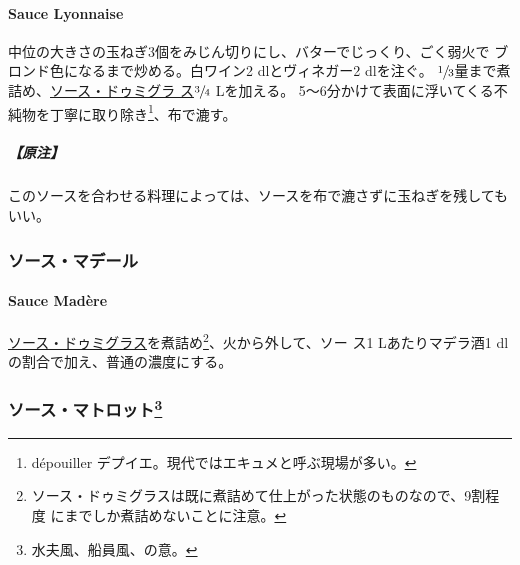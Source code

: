 \hypertarget{sauce-lyonnaise}{%
\paragraph{Sauce Lyonnaise}\label{sauce-lyonnaise}}


中位の大きさの玉ねぎ3個をみじん切りにし、バターでじっくり、ごく弱火で
ブロンド色になるまで炒める。白ワイン2 dlとヴィネガー2 dlを注ぐ。
\(\sfrac{1}{3}\)量まで煮詰め、\protect\hyperlink{sauce-demi-glace}{ソース・ドゥミグラ
ス}\(\sfrac{3}{4}\) Lを加える。
5〜6分かけて表面に浮いてくる不純物を丁寧に取り除き\footnote{dépouiller
  デプイエ。現代ではエキュメと呼ぶ現場が多い。}、布で漉す。

\hypertarget{ux539fux6ce8-5}{%
\subparagraph{【原注】}\label{ux539fux6ce8-5}}

このソースを合わせる料理によっては、ソースを布で漉さずに玉ねぎを残してもいい。

\maeaki

\hypertarget{ux30bdux30fcux30b9ux30deux30c7ux30fcux30eb}{%
\subsubsection{ソース・マデール}\label{ux30bdux30fcux30b9ux30deux30c7ux30fcux30eb}}

\hypertarget{sauce-madere}{%
\paragraph{Sauce Madère}\label{sauce-madere}}


\protect\hyperlink{sauce-demi-glace}{ソース・ドゥミグラス}を煮詰め\footnote{ソース・ドゥミグラスは既に煮詰めて仕上がった状態のものなので、9割程度
  にまでしか煮詰めないことに注意。}、火から外して、ソー ス1
Lあたりマデラ酒1 dlの割合で加え、普通の濃度にする。

\maeaki

\hypertarget{ux30bdux30fcux30b9ux30deux30c8ux30edux30c3ux30c854}{%
\subsubsection[ソース・マトロット]{\texorpdfstring{ソース・マトロット\footnote{水夫風、船員風、の意。}}{ソース・マトロット}}\label{ux30bdux30fcux30b9ux30deux30c8ux30edux30c3ux30c854}}

